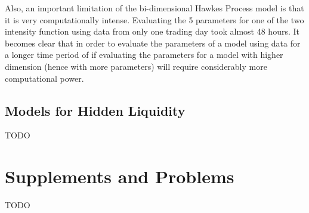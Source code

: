 Also, an important limitation of the bi-dimensional Hawkes Process model is that it is very computationally intense. Evaluating the 5 parameters for one of the two intensity function using data from only one trading day took almost 48 hours. It becomes clear that in order to evaluate the parameters of a model using data for a longer time period of if evaluating the parameters for a model with higher dimension (hence with more parameters) will require considerably more computational power. 

\subsection{Models for Hidden Liquidity}
TODO
\section{Supplements and Problems} 
TODO

